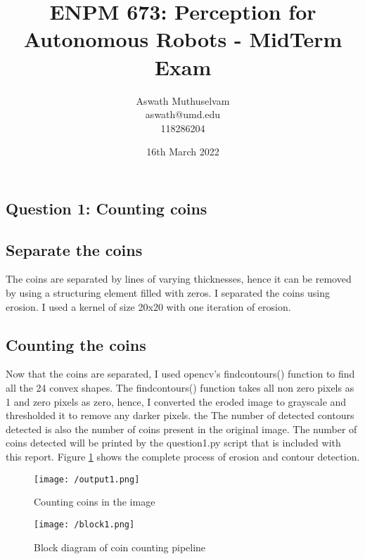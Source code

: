 \documentclass[a4paper, 10pt]{article}
\title{ENPM 673: Perception for Autonomous Robots - MidTerm Exam}
\author{Aswath Muthuselvam \\ aswath@umd.edu \\ 118286204}
\date{16th March 2022}
\begin{document}
	\maketitle
	
	\begin{multicols}{2}
		
		\section{Question 1: Counting coins}
		\subsection{Separate the coins}
		
		The coins are separated by lines of varying thicknesses, hence it can be removed by using a structuring element filled with zeros. I separated the coins using erosion. I used a kernel of size 20x20 with one iteration of erosion. 

		\subsection{Counting the coins}
		
		Now that the coins are separated, I used opencv's findcontours() function to find all the 24 convex shapes. The findcontours() function takes all non zero pixels as 1 and zero pixels as zero, hence, I converted the eroded image to grayscale and thresholded it to remove any darker pixels. the The number of detected contours detected is also the number of coins present in the original image. The number of coins detected will be printed by the question1.py script that is included with this report. Figure \ref{fig:op1} shows the complete process of erosion and contour detection.
				
		\begin{figure}[H]
			\centering
			\texttt{[image: /output1.png]}
			\caption{Counting coins in the image}
			\label{fig:op1}
		\end{figure}

		\begin{figure}[H]
			\centering
			\texttt{[image: /block1.png]}
			\caption{Block diagram of coin counting pipeline}
			\label{fig:block1}
		\end{figure}
	
		\begin{comment}
		

\end{comment}
\end{multicols}
\end{document}
